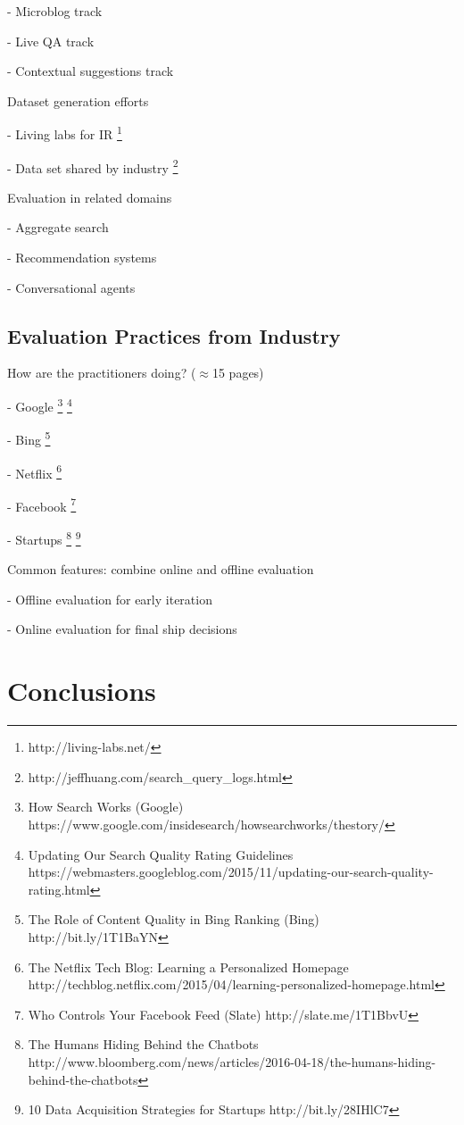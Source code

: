 \documentclass[openany]{now} %
\newcommand{\newpar}{\bigskip\noindent}
\begin{document}
- Microblog track

- Live QA track

- Contextual suggestions track

\newpar
Dataset generation efforts

- Living labs for IR \footnote{http://living-labs.net/}

- Data set shared by industry \footnote{http://jeffhuang.com/search\_query\_logs.html}

\newpar
Evaluation in related domains

- Aggregate search \cite{Zhou:2013}

- Recommendation systems \cite{gunawardana2015evaluating}

- Conversational agents

\section{Evaluation Practices from Industry}

How are the practitioners doing? (\ensuremath{\approx}15 pages)

-	Google \footnote{How Search Works (Google) https://www.google.com/insidesearch/howsearchworks/thestory/} \footnote{Updating Our Search Quality Rating Guidelines
	 https://webmasters.googleblog.com/2015/11/updating-our-search-quality-rating.html}

-	Bing \footnote{The Role of Content Quality in Bing Ranking (Bing)
	 http://bit.ly/1T1BaYN}

-	Netflix \cite{Gomez-Uribe2015}  \footnote{The Netflix Tech Blog: Learning a Personalized Homepage
	http://techblog.netflix.com/2015/04/learning-personalized-homepage.html}

-	Facebook \footnote{Who Controls Your Facebook Feed (Slate) http://slate.me/1T1BbvU}

- 	Startups \footnote{The Humans Hiding Behind the Chatbots http://www.bloomberg.com/news/articles/2016-04-18/the-humans-hiding-behind-the-chatbots}
\footnote{10 Data Acquisition Strategies for Startups http://bit.ly/28IHlC7}

\newpar
Common features: combine online and offline evaluation

- Offline evaluation for early iteration

- Online evaluation for final ship decisions

\chapter{Conclusions}
\end{document}
